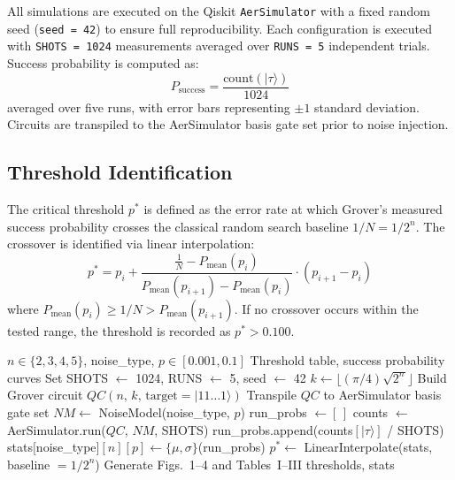 \documentclass[conference]{IEEEtran}
\begin{document}
All simulations are executed on the Qiskit \texttt{AerSimulator} with a fixed
random seed (\texttt{seed = 42}) to ensure full reproducibility. Each configuration
is executed with \texttt{SHOTS = 1024} measurements averaged over \texttt{RUNS = 5}
independent trials. Success probability is computed as:
\begin{equation}
  P_{\text{success}} = \frac{\text{count}(|\tau\rangle)}{1024}
  \label{eq:psuccess}
\end{equation}
averaged over five runs, with error bars representing $\pm 1$ standard deviation.
Circuits are transpiled to the AerSimulator basis gate set prior to noise injection.

\subsection{Threshold Identification}

The critical threshold $p^{*}$ is defined as the error rate at which Grover's
measured success probability crosses the classical random search baseline
$1/N = 1/2^n$. The crossover is identified via linear interpolation:
\begin{equation}
  p^{*} = p_i + \frac{\tfrac{1}{N} - P_{\text{mean}}(p_i)}
  {P_{\text{mean}}(p_{i+1}) - P_{\text{mean}}(p_i)}
  \cdot (p_{i+1} - p_i)
  \label{eq:threshold}
\end{equation}
where $P_{\text{mean}}(p_i) \geq 1/N > P_{\text{mean}}(p_{i+1})$. If no crossover
occurs within the tested range, the threshold is recorded as $p^{*} > 0.100$.

\begin{algorithm}
\caption{Grover Noise Analysis Simulation Pipeline}
\label{alg:pipeline}
\begin{algorithmic}[1]
\REQUIRE $n \in \{2,3,4,5\}$, noise\_type, $p \in [0.001, 0.1]$
\ENSURE Threshold table, success probability curves
\STATE Set SHOTS $\leftarrow$ 1024, RUNS $\leftarrow$ 5, seed $\leftarrow$ 42
  \STATE $k \leftarrow \lfloor (\pi/4)\sqrt{2^n} \rfloor$
  \STATE Build Grover circuit $QC(n,\, k,\, \text{target}=|11\ldots1\rangle)$
  \STATE Transpile $QC$ to AerSimulator basis gate set
      \STATE $NM \leftarrow$ NoiseModel(noise\_type, $p$)
      \STATE run\_probs $\leftarrow [\,]$
        \STATE counts $\leftarrow$ AerSimulator.run($QC$, $NM$, SHOTS)
        \STATE run\_probs.append(counts$[|\tau\rangle]$ / SHOTS)
      \ENDFOR
      \STATE stats$[$noise\_type$][n][p] \leftarrow \{\mu,\sigma\}$(run\_probs)
    \ENDFOR
    \STATE $p^{*} \leftarrow$ LinearInterpolate(stats, baseline $= 1/2^n$)
  \ENDFOR
\ENDFOR
\STATE Generate Figs.~1--4 and Tables~I--III
\RETURN thresholds, stats
\end{algorithmic}
\end{algorithm}
\end{document}
